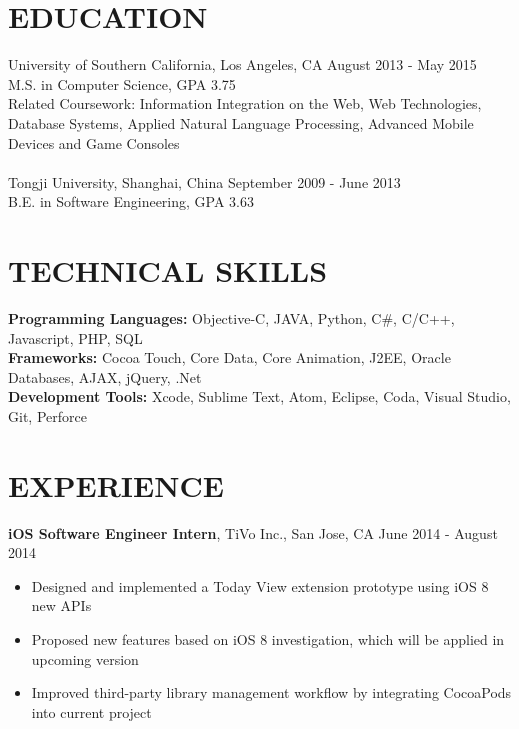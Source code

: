 \documentclass[line, overlapped]{res}
\begin{document}
\address{1133 W 36th Pl Apt 6, Los Angeles, CA 90007}
\address{(213) 806-0803, haishany@usc.edu, gitub.com/gabrielyeah}

\begin{resume}

\section{EDUCATION}
University of Southern California, Los Angeles, CA \hfill August 2013 - May 2015 \\
M.S. in Computer Science, GPA 3.75\\
Related Coursework: Information Integration on the Web, Web Technologies, Database Systems, Applied Natural Language Processing,
Advanced Mobile Devices and Game Consoles\\
\\
Tongji University, Shanghai, China \hfill September 2009 - June 2013 \\
B.E. in Software Engineering, GPA 3.63

\section{TECHNICAL SKILLS}
\textbf{Programming Languages:} Objective-C, JAVA, Python, C\#, C/C++, Javascript, PHP, SQL \\
\textbf{Frameworks:} Cocoa Touch, Core Data, Core Animation, J2EE, Oracle Databases, AJAX, jQuery, .Net\\
\textbf{Development Tools:} Xcode, Sublime Text, Atom, Eclipse, Coda, Visual Studio, Git, Perforce

\section{EXPERIENCE}

\textbf{iOS Software Engineer Intern}, TiVo Inc., San Jose, CA \hfill June 2014 - August 2014
 \begin{itemize} \itemsep -2pt
 
 \item Designed and implemented a Today View extension prototype using iOS 8 new APIs
 
 \item Proposed new features based on iOS 8 investigation, which will be applied in upcoming version
 
 \item Improved third-party library management workflow by integrating CocoaPods into current project
 

\end{itemize}
\end{resume}
\end{document}
